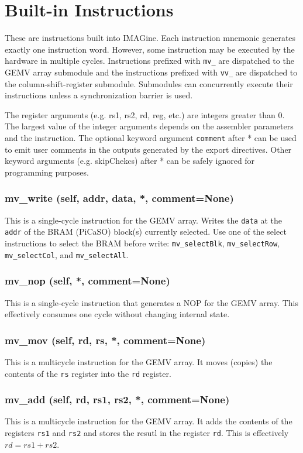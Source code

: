 \documentclass{article}
\begin{document}
\section{Built-in Instructions}
These are instructions built into IMAGine. 
Each instruction mnemonic generates exactly one instruction word. 
However, some instruction may be executed by the hardware in multiple cycles.
Instructions prefixed with \texttt{mv\_} are dispatched to the GEMV array submodule and the
instructions prefixed with \texttt{vv\_} are dispatched to the column-shift-register submodule.
Submodules can concurrently execute their instructions unless a synchronization barrier is used.

The register arguments (e.g. rs1, rs2, rd, reg, etc.) are integers greater than 0.
The largest value of the integer arguments depends on the assembler parameters and the instruction.
The optional keyword argument \texttt{comment} after * can be used to emit user comments in the
outputs generated by the export directives.
Other keyword arguments (e.g. skipChekcs) after * can be safely ignored for programming purposes.


\subsubsection*{mv\_write (self, addr, data, *, comment=None)}
This is a single-cycle instruction for the GEMV array.
Writes the \texttt{data} at the \texttt{addr} of the BRAM (PiCaSO) block(s)
currently selected.
Use one of the select instructions to select the BRAM before write:
\texttt{mv\_selectBlk},
\texttt{mv\_selectRow},
\texttt{mv\_selectCol}, and
\texttt{mv\_selectAll}.


\subsubsection*{mv\_nop (self, *, comment=None)}
This is a single-cycle instruction that generates a NOP for the GEMV array.
This effectively consumes one cycle without changing internal state.


\subsubsection*{mv\_mov (self, rd, rs, *, comment=None)}
This is a multicycle instruction for the GEMV array.
It moves (copies) the contents of the \texttt{rs} register into the \texttt{rd}
register.


\subsubsection*{mv\_add (self, rd, rs1, rs2, *, comment=None)}
This is a multicycle instruction for the GEMV array.
It adds the contents of the registers \texttt{rs1} and \texttt{rs2}
and stores the resutl in the register \texttt{rd}. 
This is effectively $rd = rs1 + rs2$.
\end{document}
